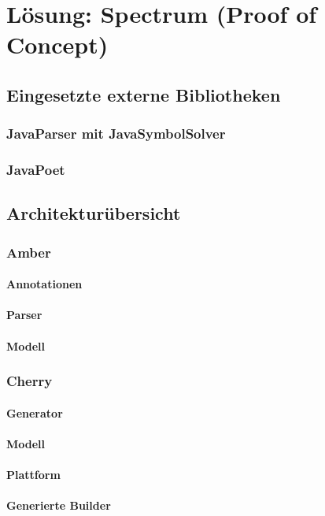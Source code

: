 \documentclass[12pt,oneside,a4paper,parskip]{scrbook}
\begin{document}
\chapter{Lösung: Spectrum (Proof of Concept)}
\section{Eingesetzte externe Bibliotheken}
\subsection{JavaParser mit JavaSymbolSolver}
\subsection{JavaPoet}
\section{Architekturübersicht}
\subsection{Amber}
\subsubsection{Annotationen}
\subsubsection{Parser}
\subsubsection{Modell}
\subsection{Cherry}
\subsubsection{Generator}
\subsubsection{Modell}
\subsubsection{Plattform}
\subsubsection{Generierte Builder}
\end{document}

